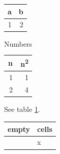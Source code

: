 \begin{center}
\begin{tabular}{|rr|}
a & b\\
\hline
1 & 2\\
\end{tabular}
\end{center}

\begin{table}[htbp]
\caption{\label{tab:org7bfd295}Numbers}
\centering
\begin{tabular}{rr}
n & n\textsuperscript{2}\\
\hline
1 & 1\\
2 & 4\\
\end{tabular}
\end{table}

See table \ref{tab:org7bfd295}.

\begin{center}
\begin{tabular}{ll}
empty & cells\\
\hline
 & x\\
\end{tabular}
\end{center}
